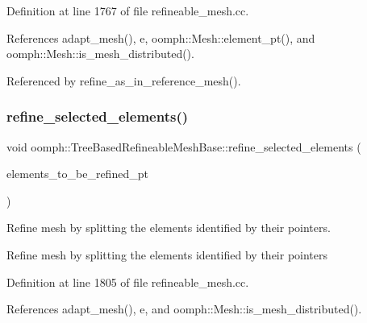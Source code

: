 Definition at line 1767 of file refineable\+\_\+mesh.\+cc.



References adapt\+\_\+mesh(), e, oomph\+::\+Mesh\+::element\+\_\+pt(), and oomph\+::\+Mesh\+::is\+\_\+mesh\+\_\+distributed().



Referenced by refine\+\_\+as\+\_\+in\+\_\+reference\+\_\+mesh().

\mbox{\label{classoomph_1_1TreeBasedRefineableMeshBase_aa6e5008f578d91d47227c1aef4ac3676}} 
\subsubsection{\texorpdfstring{refine\+\_\+selected\+\_\+elements()}{refine\_selected\_elements()}\hspace{0.1cm}{\footnotesize\ttfamily [2/2]}}
{\footnotesize\ttfamily void oomph\+::\+Tree\+Based\+Refineable\+Mesh\+Base\+::refine\+\_\+selected\+\_\+elements (\begin{DoxyParamCaption}\item[{const \hyperlink{classoomph_1_1Vector}{Vector}$<$ \hyperlink{classoomph_1_1RefineableElement}{Refineable\+Element} $\ast$$>$ \&}]{elements\+\_\+to\+\_\+be\+\_\+refined\+\_\+pt }\end{DoxyParamCaption})\hspace{0.3cm}{\ttfamily [virtual]}}



Refine mesh by splitting the elements identified by their pointers. 

Refine mesh by splitting the elements identified by their pointers 

Definition at line 1805 of file refineable\+\_\+mesh.\+cc.



References adapt\+\_\+mesh(), e, and oomph\+::\+Mesh\+::is\+\_\+mesh\+\_\+distributed().

\mbox{\label{classoomph_1_1TreeBasedRefineableMeshBase_ae238476195a0ceeb2cdb680620fb97a3}} 
